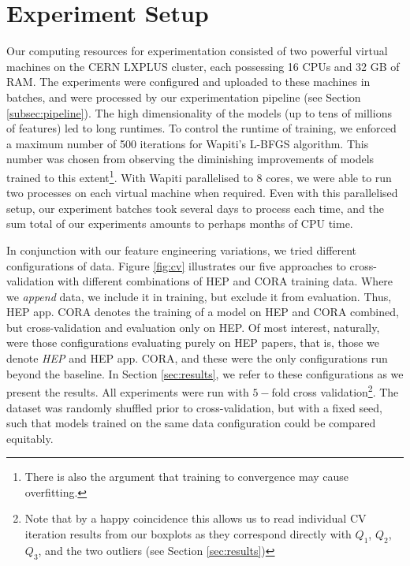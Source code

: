 \section{Experiment Setup}
\label{sec:experimentsetup}

Our computing resources for experimentation consisted of two powerful virtual machines on the CERN LXPLUS cluster, each possessing 16 CPUs and 32 GB of RAM. The experiments were configured and uploaded to these machines in batches, and were processed by our experimentation pipeline (see Section \ref{subsec:pipeline}). The high dimensionality of the models (up to tens of millions of features) led to long runtimes. To control the runtime of training, we enforced a maximum number of 500 iterations for Wapiti's L-BFGS algorithm. This number was chosen from observing the diminishing improvements of models trained to this extent\footnote{There is also the argument that training to convergence may cause overfitting.}. With Wapiti parallelised to 8 cores, we were able to run two processes on each virtual machine when required. Even with this parallelised setup, our experiment batches took several days to process each time, and the sum total of our experiments amounts to perhaps months of CPU time.

In conjunction with our feature engineering variations, we tried different configurations of data. Figure \ref{fig:cv} illustrates our five approaches to cross-validation with different combinations of HEP and CORA training data. Where we \emph{append} data, we include it in training, but exclude it from evaluation. Thus, HEP app. CORA denotes the training of a model on HEP and CORA combined, but cross-validation and evaluation only on HEP. Of most interest, naturally, were those configurations evaluating purely on HEP papers, that is, those we denote \emph{HEP} and {HEP app. CORA}, and these were the only configurations run beyond the baseline. In Section \ref{sec:results}, we refer to these configurations as we present the results. All experiments were run with $5-$fold cross validation\footnote{Note that by a happy coincidence this allows us to read individual CV iteration results from our boxplots as they correspond directly with $Q_1$, $Q_2$, $Q_3$, and the two outliers (see Section \ref{sec:results})}. The dataset was randomly shuffled prior to cross-validation, but with a fixed seed, such that models trained on the same data configuration could be compared equitably.

